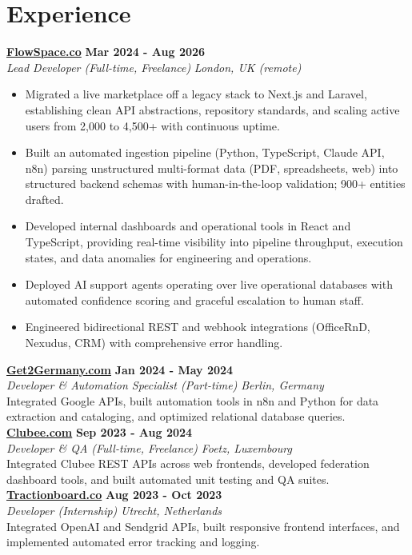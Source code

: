 \documentclass[a4paper,10pt]{article}
\newcommand{\role}[4]{%
 \textbf{#1} \hfill \textbf{#2}\\[1pt]%
 \textit{#3} \hfill \textit{#4}\\[2pt]%
}
\begin{document}
\section{Experience}

\role{\href{https://flowspace.co}{FlowSpace.co}}{Mar 2024 - Aug 2026}{Lead Developer (Full-time, Freelance)}{London, UK (remote)}
\begin{itemize}
 \item Migrated a live marketplace off a legacy stack to Next.js and Laravel, establishing clean API abstractions, repository standards, and scaling active users from 2,000 to 4,500+ with continuous uptime.
 \item Built an automated ingestion pipeline (Python, TypeScript, Claude API, n8n) parsing unstructured multi-format data (PDF, spreadsheets, web) into structured backend schemas with human-in-the-loop validation; 900+ entities drafted.
 \item Developed internal dashboards and operational tools in React and TypeScript, providing real-time visibility into pipeline throughput, execution states, and data anomalies for engineering and operations.
 \item Deployed AI support agents operating over live operational databases with automated confidence scoring and graceful escalation to human staff.
 \item Engineered bidirectional REST and webhook integrations (OfficeRnD, Nexudus, CRM) with comprehensive error handling.
\end{itemize}

\role{\href{https://get2germany.com}{Get2Germany.com}}{Jan 2024 - May 2024}{Developer \& Automation Specialist (Part-time)}{Berlin, Germany}
Integrated Google APIs, built automation tools in n8n and Python for data extraction and cataloging, and optimized relational database queries.\\[1pt]

\role{\href{https://clubee.com}{Clubee.com}}{Sep 2023 - Aug 2024}{Developer \& QA (Full-time, Freelance)}{Foetz, Luxembourg}
Integrated Clubee REST APIs across web frontends, developed federation dashboard tools, and built automated unit testing and QA suites.\\[1pt]

\role{\href{https://tractionboard.co}{Tractionboard.co}}{Aug 2023 - Oct 2023}{Developer (Internship)}{Utrecht, Netherlands}
Integrated OpenAI and Sendgrid APIs, built responsive frontend interfaces, and implemented automated error tracking and logging.
\end{document}
